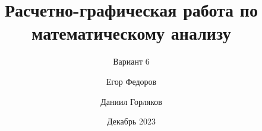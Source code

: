 \documentclass{beamer}
\title[РГР по матанализу]
{Расчетно-графическая работа по математическому анализу}
\subtitle{Вариант 6}
\author[Федоров, Горляков]
{Егор Федоров \and Даниил Горляков}
\institute[ИТМО]{Университет ИТМО}
\date[2023 г.]{Декабрь 2023}
\begin{document}
\frame{\titlepage}



\end{document}
